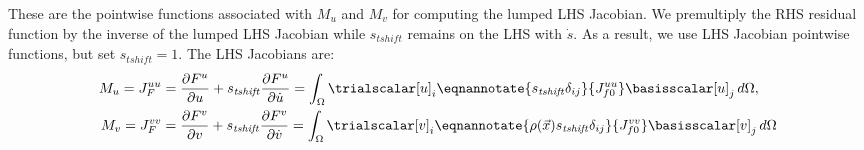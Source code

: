 These are the pointwise functions associated with $M_u$ and $M_v$ for
computing the lumped LHS Jacobian. We premultiply the RHS residual
function by the inverse of the lumped LHS Jacobian while
$s_\mathit{tshift}$ remains on the LHS with $\dot{s}$. As a result, we
use LHS Jacobian pointwise functions, but set $s_\mathit{tshift}=1$.
The LHS Jacobians are:
\begin{align}
  M_u = J_F^{uu} &= \frac{\partial F^u}{\partial u} + s_\mathit{tshift} \frac{\partial F^u}{\partial \dot{u}} =
             \int_\Omega \trialscalar[u]_i \eqnannotate{s_\mathit{tshift} \delta_{ij}}{J^{uu}_{f0}} \basisscalar[u]_j  \, d\Omega, \\
  M_v = J_F^{vv} &= \frac{\partial F^v}{\partial v} + s_\mathit{tshift} \frac{\partial F^v}{\partial \dot{v}} =
             \int_\Omega \trialscalar[v]_i \eqnannotate{\rho(\vec{x}) s_\mathit{tshift} \delta_{ij}}{J ^{vv}_{f0}} \basisscalar[v]_j \, d\Omega
\end{align}


